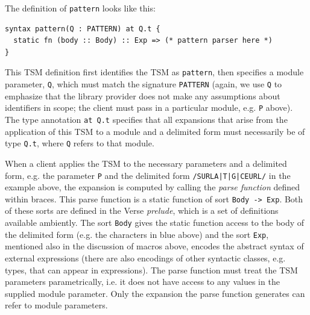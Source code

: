 The definition of \lstinline{pattern} looks like this:
\begin{lstlisting}[numbers=none]
syntax pattern(Q : PATTERN) at Q.t {
  static fn (body :: Body) :: Exp => (* pattern parser here *)
}
\end{lstlisting}
This TSM definition first identifies the TSM as \lstinline{pattern}, then specifies a module parameter, \lstinline{Q}, which must match the signature \lstinline{PATTERN} (again, we use \lstinline{Q} to emphasize that the library provider does not make any assumptions about identifiers in scope; the client must pass in a particular module, e.g. \lstinline{P} above). The type annotation \lstinline{at Q.t} specifies that all expansions that arise from the application of this TSM to a module and a delimited form must necessarily be of type \lstinline{Q.t}, where \lstinline{Q} refers to that module. 

When a client applies the TSM to the necessary parameters and a delimited form, e.g. the parameter \lstinline{P} and the delimited form \lstinline{/SURLA|T|G|CEURL/} in the example above, the expansion is computed by calling the \emph{parse function} defined within braces. This parse function is a static function of sort \lstinline{Body -> Exp}. Both of these sorts are defined in the Verse \emph{prelude}, which is a set of definitions available ambiently. The sort \lstinline{Body} gives the static function access to the {body} of the delimited form (e.g. the characters in blue above) and the sort \lstinline{Exp}, mentioned also in the discussion of macros above,  encodes the abstract syntax of external expressions (there are also encodings of other syntactic classes, e.g. types, that can appear in expressions). The parse function must treat the TSM parameters parametrically, i.e. it does not have access to any values in the supplied module parameter. Only the expansion the parse function generates can refer to module parameters. 


